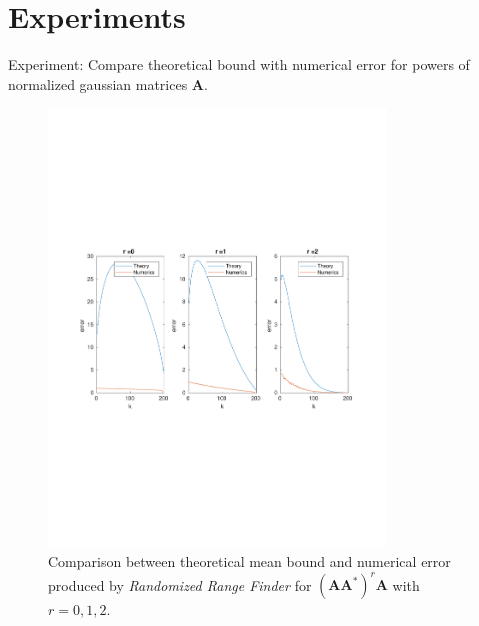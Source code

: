 \documentclass{beamer}
\newcommand{\mtx}[1]{\bm{#1}}
\newcommand{\adj}{*}
\begin{document}
\section{Experiments}
\begin{frame}{Experiment: Compare theoretical bound with numerical error
for powers of normalized gaussian matrices $\mtx{A}$.}
\begin{figure}[H]\label{fig:exp1-1}
\begin{center}
\includegraphics[width=0.8\textwidth, trim=0cm 8cm 0cm 9cm, clip=true]{../report/figures/1-4.pdf}
\end{center}
\caption{Comparison between theoretical mean bound
and numerical error produced by \textit{Randomized Range Finder}
 for $(\mtx{A}\mtx{A}^\adj)^r\mtx{A}$ with $r=0,1,2$. }
\end{figure}
\end{frame}
\end{document}
